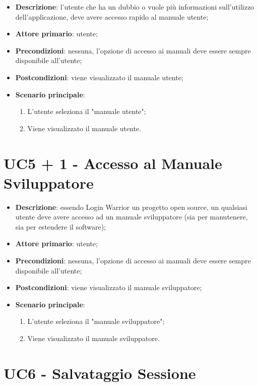 \begin{itemize}
\begin{itemize}
  \item \textbf{Descrizione}: l'utente che ha un dubbio o vuole più informazioni sull'utilizzo dell'applicazione, deve avere accesso rapido al manuale utente;
  \item \textbf{Attore primario}: utente;
  \item \textbf{Precondizioni}: nessuna, l'opzione di accesso ai manuali deve essere sempre disponibile all'utente;
  \item \textbf{Postcondizioni}: viene visualizzato il manuale utente;
  \item \textbf{Scenario principale}: 
  \begin{enumerate}
    \item L'utente seleziona il "manuale utente";
    \item Viene visualizzato il manuale utente.
  \end{enumerate}
\end{itemize}

\section{UC5 + 1 - Accesso al Manuale Sviluppatore}

\begin{itemize}
  \item \textbf{Descrizione}: essendo Login Warrior un progetto open source, un qualsiasi utente deve avere accesso ad un manuale sviluppatore (sia per manutenere, sia per estendere il software);
  \item \textbf{Attore primario}: utente;
  \item \textbf{Precondizioni}: nessuna, l'opzione di accesso ai manuali deve essere sempre disponibile all'utente;
  \item \textbf{Postcondizioni}: viene visualizzato il manuale sviluppatore;
  \item \textbf{Scenario principale}: 
  \begin{enumerate}
    \item L'utente seleziona il "manuale sviluppatore";
    \item Viene visualizzato il manuale sviluppatore.
  \end{enumerate}
\end{itemize}

\section{UC6 - Salvataggio Sessione}


\end{itemize}
